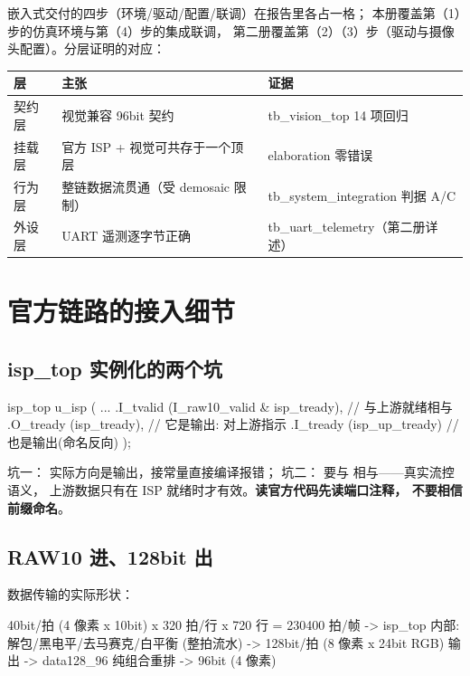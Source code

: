 嵌入式交付的四步（环境/驱动/配置/联调）在报告里各占一格；
本册覆盖第（1）步的仿真环境与第（4）步的集成联调，
第二册覆盖第（2）（3）步（驱动与摄像头配置）。分层证明的对应：

\begin{center}
\begin{tabular}{lll}
\toprule
\rowcolor{rowtint}\textbf{层} & \textbf{主张} & \textbf{证据} \\
\midrule
契约层 & 视觉兼容 96bit 契约 & tb\_vision\_top 14 项回归 \\
挂载层 & 官方 ISP + 视觉可共存于一个顶层 & elaboration 零错误 \\
行为层 & 整链数据流贯通（受 demosaic 限制） & tb\_system\_integration 判据 A/C \\
外设层 & UART 遥测逐字节正确 & tb\_uart\_telemetry（第二册详述） \\
\bottomrule
\end{tabular}
\end{center}

\section{官方链路的接入细节}

\subsection{isp\_top 实例化的两个坑}

\begin{Verilog}
isp_top u_isp (
    ...
    .I_tvalid  (I_raw10_valid & isp_tready),  // 与上游就绪相与
    .O_tready  (isp_tready),                  // 它是输出: 对上游指示
    .I_tready  (isp_up_tready)                // 也是输出(命名反向)
);
\end{Verilog}

坑一： 实际方向是输出，接常量直接编译报错；
坑二： 要与  相与——真实流控语义，
上游数据只有在 ISP 就绪时才有效。\textbf{读官方代码先读端口注释，
不要相信前缀命名}。

\subsection{RAW10 进、128bit 出}

数据传输的实际形状：

\begin{Verilog}
40bit/拍 (4 像素 x 10bit) x 320 拍/行 x 720 行 = 230400 拍/帧
   -> isp_top 内部: 解包/黑电平/去马赛克/白平衡 (整拍流水)
   -> 128bit/拍 (8 像素 x 24bit RGB) 输出
   -> data128_96 纯组合重排 -> 96bit (4 像素)
\end{Verilog}

